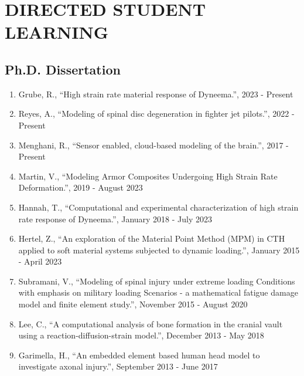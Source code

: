 \documentclass[a4paper,10pt]{article}
\begin{document}
    \section*{DIRECTED STUDENT LEARNING}
    \subsection*{Ph.D. Dissertation}
    \begin{enumerate}
    
        \item Grube, R., ``High strain rate material response of Dyneema.'', 2023 - Present
        
        \item Reyes, A., ``Modeling of spinal disc degeneration in fighter jet pilots.'', 2022 - Present
        
        \item Menghani, R., ``Sensor enabled, cloud-based modeling of the brain.'', 2017 - Present
        
        \item Martin, V., ``Modeling Armor Composites Undergoing High Strain Rate Deformation.'', 2019 - August 2023
        
        \item Hannah, T., ``Computational and experimental characterization of high strain rate response of Dyneema.'', January 2018 - July 2023
        
        \item Hertel, Z., ``An exploration of the Material Point Method (MPM) in CTH applied to soft material systems subjected to dynamic loading.'', January 2015 - April 2023
        
        \item Subramani, V., ``Modeling of spinal injury under extreme loading Conditions with emphasis on military loading Scenarios - a mathematical fatigue damage model and finite element study.'', November 2015 - August 2020
        
        \item Lee, C., ``A computational analysis of bone formation in the cranial vault using a reaction-diffusion-strain model.'', December 2013 - May 2018
        
        \item Garimella, H., ``An embedded element based human head model to investigate axonal injury.'', September 2013 - June 2017
        
    \end{enumerate}
    
\end{document}
